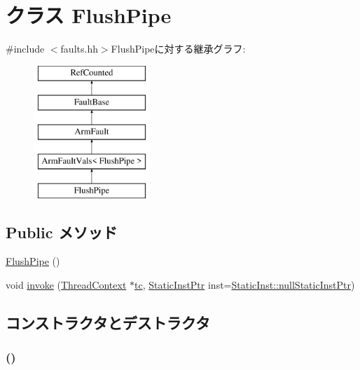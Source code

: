 \hypertarget{classArmISA_1_1FlushPipe}{
\section{クラス FlushPipe}
\label{classArmISA_1_1FlushPipe}
}


{\ttfamily \#include $<$faults.hh$>$}FlushPipeに対する継承グラフ:\begin{figure}[H]
\begin{center}
\leavevmode
\includegraphics[height=5cm]{classArmISA_1_1FlushPipe}
\end{center}
\end{figure}
\subsection*{Public メソッド}
\begin{DoxyCompactItemize}
\item 
\hyperlink{classArmISA_1_1FlushPipe_a4de297117c6f3daf568b1b84528ce788}{FlushPipe} ()
\item 
void \hyperlink{classArmISA_1_1FlushPipe_a2bd783b42262278d41157d428e1f8d6f}{invoke} (\hyperlink{classThreadContext}{ThreadContext} $\ast$\hyperlink{namespaceArmISA_a5aff829af55e65b802d83dfcef4e9dd0}{tc}, \hyperlink{classRefCountingPtr}{StaticInstPtr} inst=\hyperlink{classStaticInst_aa793d9793af735f09096369fb17567b6}{StaticInst::nullStaticInstPtr})
\end{DoxyCompactItemize}


\subsection{コンストラクタとデストラクタ}
\hypertarget{classArmISA_1_1FlushPipe_a4de297117c6f3daf568b1b84528ce788}{
\subsubsection[{FlushPipe}]{ ()}}
\label{classArmISA_1_1FlushPipe_a4de297117c6f3daf568b1b84528ce788}



